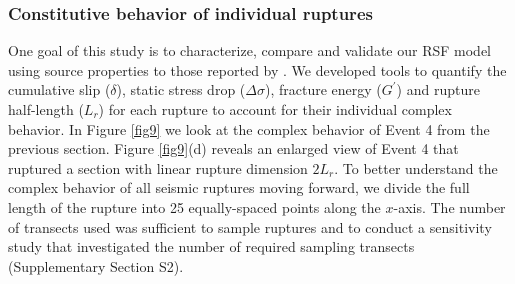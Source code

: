 \documentclass[preprint,1p, 10pt,authoryear]{elsarticle}
\begin{document}
\subsubsection{Constitutive behavior of individual ruptures }
\label{Constitutive}
One goal of this study is to characterize, compare and validate our RSF model using source properties to those reported by \citet{Selvadurai2019}. We developed tools to quantify the cumulative slip ($\delta$), static stress drop ($\Delta \sigma$), fracture energy ($G^{'}$) and rupture half-length ($L_{r}$) for each rupture to account for their individual complex behavior. In Figure \ref{fig9} we look at the complex behavior of Event 4 from the previous section. Figure \ref{fig9}(d) reveals an enlarged view of Event 4 that ruptured a section with linear rupture dimension $2L_{r}$.  To better understand the complex behavior of all seismic ruptures moving forward, we divide the full length of the rupture into 25 equally-spaced points along the $x$-axis. The number of transects used was sufficient to sample ruptures and to conduct a sensitivity study that investigated the number of required sampling transects (Supplementary Section S2).   
\end{document}
